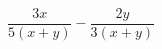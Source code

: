 \begin{ex}
	\begin{condition}
		\( \dfrac{3x}{5(x+y)}-\dfrac{2y}{3(x+y)} \)
	\end{condition}
\end{ex}